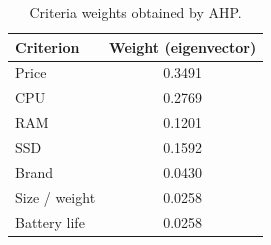 \begin{table}[H]
\centering
\caption{Criteria weights obtained by AHP.}
\label{tab:ahp-weights}
\begin{tabular}{lc}
\toprule
Criterion & Weight (eigenvector) \\
\midrule
Price & 0.3491 \\
CPU & 0.2769 \\
RAM & 0.1201 \\
SSD & 0.1592 \\
Brand & 0.0430 \\
Size / weight & 0.0258 \\
Battery life & 0.0258 \\
\bottomrule
\end{tabular}
\end{table}

